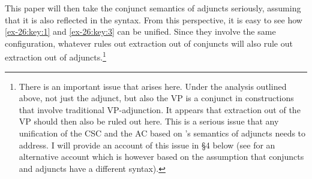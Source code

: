 \documentclass[output=paper]{langsci/langscibook}
\begin{document}
This paper will then take the conjunct semantics of adjuncts seriously,
assuming that it is also reflected in the syntax. From this perspective, it is
easy to see how \eqref{ex-26:key:1} and \eqref{ex-26:key:3} can be unified. Since they involve the same
configuration, whatever rules out extraction out of conjuncts will also rule
out extraction out of adjuncts.\footnote{There is an important issue that
    arises here. Under the analysis outlined above, not just the adjunct, but
    also the VP is a conjunct in constructions that involve traditional
    VP-adjunction.  It appears that extraction out of the VP should then also
    be ruled out here.  This is a serious issue that any unification of the
    \gls{CSC} and the \glsdesc{AC} based on \citeauthor{Higginbotham1985}’s
    semantics of adjuncts needs to address. I will provide an account of this
    issue in §4 below (see \citealt{Takahashi1994} for an alternative account
    which is however based on the assumption that conjuncts and adjuncts have a
different syntax).}
\end{document}
